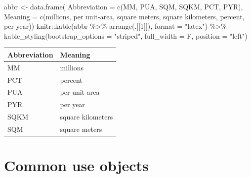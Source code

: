\documentclass[10pt,landscape,a3paper]{article}
\newenvironment{Shaded}{\begin{snugshade}}{\end{snugshade}}
\newcommand{\AttributeTok}[1]{\textcolor[rgb]{0.77,0.63,0.00}{#1}}
\newcommand{\DecValTok}[1]{\textcolor[rgb]{0.00,0.00,0.81}{#1}}
\newcommand{\FunctionTok}[1]{\textcolor[rgb]{0.00,0.00,0.00}{#1}}
\newcommand{\NormalTok}[1]{#1}
\newcommand{\OtherTok}[1]{\textcolor[rgb]{0.56,0.35,0.01}{#1}}
\newcommand{\SpecialCharTok}[1]{\textcolor[rgb]{0.00,0.00,0.00}{#1}}
\newcommand{\StringTok}[1]{\textcolor[rgb]{0.31,0.60,0.02}{#1}}
\begin{document}
\begin{Shaded}
\begin{Highlighting}[]
\NormalTok{abbr }\OtherTok{\textless{}{-}} \FunctionTok{data.frame}\NormalTok{(}
  \AttributeTok{Abbreviation =} \FunctionTok{c}\NormalTok{(}\StringTok{\textquotesingle{}MM\textquotesingle{}}\NormalTok{, }\StringTok{\textquotesingle{}PUA\textquotesingle{}}\NormalTok{, }\StringTok{\textquotesingle{}SQM\textquotesingle{}}\NormalTok{, }\StringTok{\textquotesingle{}SQKM\textquotesingle{}}\NormalTok{, }\StringTok{\textquotesingle{}PCT\textquotesingle{}}\NormalTok{, }\StringTok{\textquotesingle{}PYR\textquotesingle{}}\NormalTok{),}
  \AttributeTok{Meaning =} \FunctionTok{c}\NormalTok{(}\StringTok{\textquotesingle{}millions\textquotesingle{}}\NormalTok{, }\StringTok{\textquotesingle{}per unit{-}area\textquotesingle{}}\NormalTok{, }\StringTok{\textquotesingle{}square meters\textquotesingle{}}\NormalTok{, }\StringTok{\textquotesingle{}square kilometers\textquotesingle{}}\NormalTok{, }\StringTok{\textquotesingle{}percent\textquotesingle{}}\NormalTok{, }\StringTok{\textquotesingle{}per year\textquotesingle{}}\NormalTok{))}
\NormalTok{knitr}\SpecialCharTok{::}\FunctionTok{kable}\NormalTok{(abbr }\SpecialCharTok{\%\textgreater{}\%} \FunctionTok{arrange}\NormalTok{(.[[}\DecValTok{1}\NormalTok{]]), }\AttributeTok{format =} \StringTok{"latex"}\NormalTok{) }\SpecialCharTok{\%\textgreater{}\%}
  \FunctionTok{kable\_styling}\NormalTok{(}\AttributeTok{bootstrap\_options =} \StringTok{"striped"}\NormalTok{, }\AttributeTok{full\_width =}\NormalTok{ F, }\AttributeTok{position =} \StringTok{"left"}\NormalTok{)}
\end{Highlighting}
\end{Shaded}

\begin{tabular}{l|l}
\hline
Abbreviation & Meaning\\
\hline
MM & millions\\
\hline
PCT & percent\\
\hline
PUA & per unit-area\\
\hline
PYR & per year\\
\hline
SQKM & square kilometers\\
\hline
SQM & square meters\\
\hline
\end{tabular}

\hypertarget{common-use-objects}{%
\section{Common use objects}\label{common-use-objects}}
\end{document}
